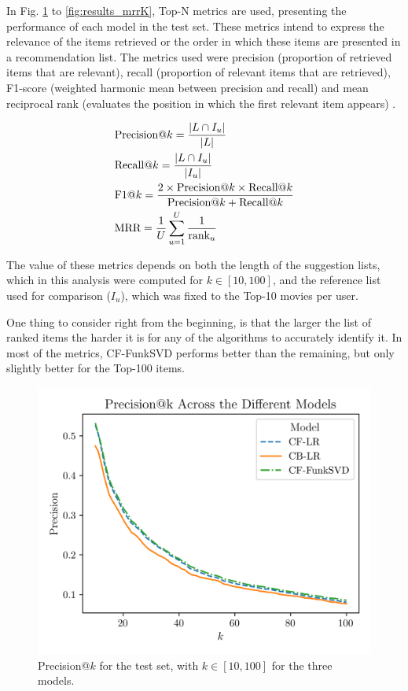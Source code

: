 \documentclass[conference]{IEEEtran}
\begin{document}
In Fig. \ref{fig:results_precisionK} to \ref{fig:results_mrrK}, Top-N metrics are used, presenting the performance of each model in the test set. These metrics intend to express the relevance of the items retrieved or the order in which these items are presented in a recommendation list. The metrics used were precision (proportion of retrieved items that are relevant), recall (proportion of relevant items that are retrieved), F1-score (weighted harmonic mean between precision and recall) and mean reciprocal rank (evaluates the position in which the first relevant item appears) \cite{9379914, ekstrand2020lenskit}.

\begin{align}
&\text{Precision@}k = \frac{|L \cap I_u|}{|L|} \notag \\
&\text{Recall@}k = \frac{|L \cap I_u|}{|I_u|} \notag \\
&\text{F1@}k = \frac{2 \times \text{Precision@}k \times \text{Recall@}k}{\text{Precision@}k + \text{Recall@}k} \notag \\
&\text{MRR} = \frac{1}{U} \sum_{u=1}^{U} \frac{1}{\text{rank}_u}
\end{align}

The value of these metrics depends on both the length of the suggestion lists, which in this analysis were computed for $k \in [10,100]$, and the reference list used for comparison ($I_u$), which was fixed to the Top-10 movies per user.

One thing to consider right from the beginning, is that the larger the list of ranked items the harder it is for any of the algorithms to accurately identify it. In most of the metrics, CF-FunkSVD performs better than the remaining, but only slightly better for the Top-100 items.


\begin{figure}[H]
    \centering
    \includegraphics[width=1\linewidth]{assets/results_precisionK.png}
    \caption{Precision@$k$ for the test set, with $k \in [10,100]$ for the three models.}
    \label{fig:results_precisionK}
\end{figure}
\end{document}
